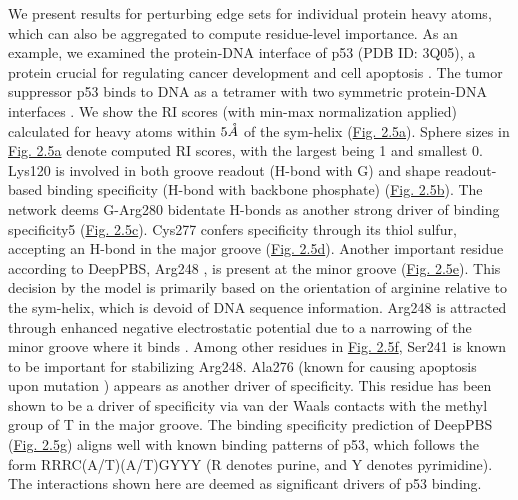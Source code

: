 \par
We present results for perturbing edge sets for individual protein heavy atoms, which can also be aggregated to compute residue-level importance. As an example, we examined the protein-DNA interface of p53 (PDB ID: 3Q05), a protein crucial for regulating cancer development and cell apoptosis \citep{Joerger2008}. The tumor suppressor p53 binds to DNA as a tetramer with two symmetric protein-DNA interfaces \citep{Kitayner2010, Petty2011}. We show the RI scores (with min-max normalization applied) calculated for heavy atoms within $5\AA$ of the sym-helix (\hyperref[fig:pdna4]{Fig. 2.5a}). Sphere sizes in \hyperref[fig:pdna4]{Fig. 2.5a} denote computed RI scores, with the largest being 1 and smallest 0. Lys120 \citep{Kitayner2006} is involved in both groove readout (H-bond with G) and shape readout-based binding specificity (H-bond with backbone phosphate) (\hyperref[fig:pdna4]{Fig. 2.5b}). The network deems G-Arg280 \citep{Kitayner2006} bidentate H-bonds as another strong driver of binding specificity5 (\hyperref[fig:pdna4]{Fig. 2.5c}). Cys277 confers specificity through its thiol sulfur, accepting an H-bond in the major groove \citep{Kitayner2006} (\hyperref[fig:pdna4]{Fig. 2.5d}). Another important residue according to DeepPBS, Arg248 \citep{Barakat2011}, is present at the minor groove (\hyperref[fig:pdna4]{Fig. 2.5e}). This decision by the model is primarily based on the orientation of arginine relative to the sym-helix, which is devoid of DNA sequence information. Arg248 is attracted through enhanced negative electrostatic potential due to a narrowing of the minor groove where it binds \citep{Kitayner2010}. Among other residues in \hyperref[fig:pdna4]{Fig. 2.5f}, Ser241 is known \citep{Barakat2011} to be important for stabilizing Arg248. Ala276 (known for causing apoptosis upon mutation \citep{Reaz2013}) appears as another driver of specificity. This residue has been shown to be a driver of specificity via van der Waals contacts with the methyl group of T in the major groove\citep{Kitayner2006}. The binding specificity prediction of DeepPBS (\hyperref[fig:pdna4]{Fig. 2.5g}) aligns well with known binding patterns of p53, which follows the form RRRC(A/T)(A/T)GYYY (R denotes purine, and Y denotes pyrimidine). The interactions shown here are deemed \citep{Joerger2008, Vousden2009} as significant drivers of p53 binding.

